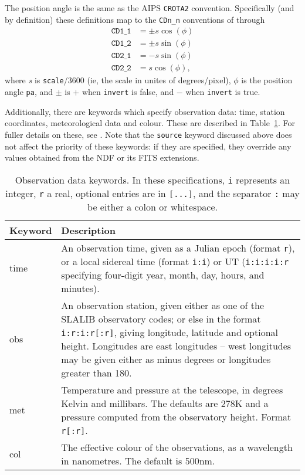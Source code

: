 \documentclass[twoside,11pt,nolof]{starlink}
\providecommand{\ASTROMref}{\xref{{\footnotesize ASTROM}}{sun5}{}}
\begin{document}
The position angle is the same as the AIPS \texttt{CROTA2}
convention. Specifically (and by definition) these definitions map to the
\texttt{CDn\_n} conventions of \cite{fitswcs2} through
\begin{align*}
\texttt{CD1\_1} & = \pm s \cos( \phi ) \\
\texttt{CD1\_2} & = \pm s \sin( \phi ) \\
\texttt{CD2\_1} & = - s \sin( \phi ) \\
\texttt{CD2\_2} & = s \cos( \phi ),
\end{align*}
where \textit{s} is \texttt{scale}/3600 (ie, the scale in unites of
degrees/pixel), $\phi$ is the position angle \texttt{pa}, and $\pm$ is $+$
when \texttt{invert} is false, and $-$ when \texttt{invert} is true.

Additionally, there are keywords which specify observation data: time, station
coordinates, meteorological data and colour.  These are described in
Table~\ref{tab:datetime}.  For fuller details on these, see \ASTROMref.  Note
that the \texttt{source} keyword discussed above does not affect the priority
of these keywords: if they are specified, they override any values obtained
from the NDF or its FITS extensions.

\begin{table}
\begin{center}
\begin{tabular}{l|p{10cm}}
Keyword & Description \\ \hline
time & An observation time, given as a Julian epoch (format \texttt{r}), or a
local sidereal time (format \texttt{i:i}) or UT (\texttt{i:i:i:i:r} specifying
four-digit year, month, day, hours, and minutes). \\
obs & An observation station, given either as one of the SLALIB observatory
codes; or else in the format \texttt{i:r:i:r[:r]}, giving longitude, latitude
and optional height. Longitudes are east longitudes -- west longitudes may be
given either as minus degrees or longitudes greater than 180. \\
met & Temperature and pressure at the telescope, in degrees Kelvin and
millibars. The defaults are 278K and a pressure computed from the observatory
height. Format \texttt{r[:r]}. \\
col & The effective colour of the observations, as a wavelength in
nanometres. The default is 500nm.
\end{tabular}
\end{center}
\caption{\label{tab:datetime}Observation data keywords. In these
  specifications, \texttt{i} represents an integer, \texttt{r} a real,
  optional entries are in \texttt{[...]}, and the separator \texttt{:} may be
  either a colon or whitespace.}
\end{table}
\end{document}
